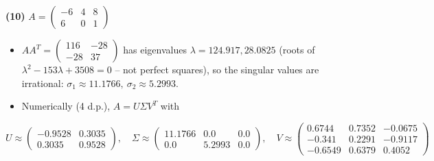 \noindent\textbf{(10)} $A=\begin{pmatrix}-6 & 4 & 8 \\ 6 & 0 & 1\end{pmatrix}$
\begin{itemize}\item $AA^T=\begin{pmatrix}116 & -28 \\ -28 & 37\end{pmatrix}$ has eigenvalues $\lambda=124.917, 28.0825$ (roots of $\lambda^2-153\lambda+3508=0$ -- not perfect squares), so the singular values are irrational: $\sigma_1\approx11.1766,\ \sigma_2\approx5.2993$.
\item Numerically (4 d.p.), $A=U\Sigma V^T$ with\end{itemize}
\[ U\approx\begin{pmatrix}-0.9528 & 0.3035 \\ 0.3035 & 0.9528\end{pmatrix},\quad \Sigma\approx\begin{pmatrix}11.1766 & 0.0 & 0.0 \\ 0.0 & 5.2993 & 0.0\end{pmatrix},\quad V\approx\begin{pmatrix}0.6744 & 0.7352 & -0.0675 \\ -0.341 & 0.2291 & -0.9117 \\ -0.6549 & 0.6379 & 0.4052\end{pmatrix} \]
